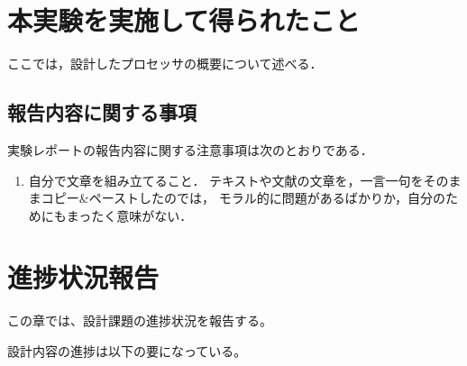 \documentclass{jarticle}[11pt]
\begin{document}

\section{本実験を実施して得られたこと}
\label{sec:本実験を実施して得られたこと}

ここでは，設計したプロセッサの概要について述べる．

\subsection{報告内容に関する事項}
実験レポートの報告内容に関する注意事項は次のとおりである．
\begin{enumerate}
\item 自分で文章を組み立てること．
テキストや文献の文章を，一言一句をそのままコピー\&ペーストしたのでは，
モラル的に問題があるばかりか，自分のためにもまったく意味がない．
\end{enumerate}





\section{進捗状況報告}
\label{sec:進捗状況報告}

この章では、設計課題の進捗状況を報告する。

設計内容の進捗は以下の要になっている。
\end{document}
